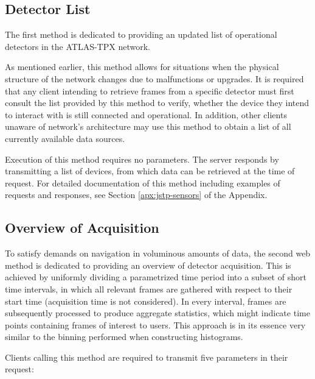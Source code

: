 \subsection{Detector List}
The first method is dedicated to providing an updated list of operational detectors in the ATLAS-TPX network.

As mentioned earlier, this method allows for situations when the physical structure of the network changes due to malfunctions or upgrades. It is required that any client intending to retrieve frames from a specific detector must first consult the list provided by this method to verify, whether the device they intend to interact with is still connected and operational. In addition, other clients unaware of network's architecture may use this method to obtain a list of all currently available data sources.

Execution of this method requires no parameters. The server responds by transmitting a list of devices, from which data can be retrieved at the time of request. For detailed documentation of this method including examples of requests and responses, see Section \ref{apx:jstp-sensors} of the Appendix.

\subsection{Overview of Acquisition}
To satisfy demands on navigation in voluminous amounts of data, the second web method is dedicated to providing an overview of detector acquisition. This is achieved by uniformly dividing a parametrized time period into a subset of short time intervals, in which all relevant frames are gathered with respect to their start time (acquisition time is not considered). In every interval, frames are subsequently processed to produce aggregate statistics, which might indicate time points containing frames of interest to users. This approach is in its essence very similar to the binning performed when constructing histograms.

Clients calling this method are required to transmit five parameters in their request:

